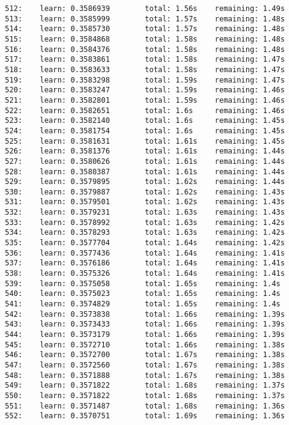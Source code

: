 \documentclass[11pt]{article}
\begin{document}
\begin{Verbatim}[commandchars=\\\{\}]
512:    learn: 0.3586939        total: 1.56s    remaining: 1.49s
513:    learn: 0.3585999        total: 1.57s    remaining: 1.48s
514:    learn: 0.3585730        total: 1.57s    remaining: 1.48s
515:    learn: 0.3584868        total: 1.58s    remaining: 1.48s
516:    learn: 0.3584376        total: 1.58s    remaining: 1.48s
517:    learn: 0.3583861        total: 1.58s    remaining: 1.47s
518:    learn: 0.3583633        total: 1.58s    remaining: 1.47s
519:    learn: 0.3583298        total: 1.59s    remaining: 1.47s
520:    learn: 0.3583247        total: 1.59s    remaining: 1.46s
521:    learn: 0.3582801        total: 1.59s    remaining: 1.46s
522:    learn: 0.3582651        total: 1.6s     remaining: 1.46s
523:    learn: 0.3582140        total: 1.6s     remaining: 1.45s
524:    learn: 0.3581754        total: 1.6s     remaining: 1.45s
525:    learn: 0.3581631        total: 1.61s    remaining: 1.45s
526:    learn: 0.3581376        total: 1.61s    remaining: 1.44s
527:    learn: 0.3580626        total: 1.61s    remaining: 1.44s
528:    learn: 0.3580387        total: 1.61s    remaining: 1.44s
529:    learn: 0.3579895        total: 1.62s    remaining: 1.44s
530:    learn: 0.3579887        total: 1.62s    remaining: 1.43s
531:    learn: 0.3579501        total: 1.62s    remaining: 1.43s
532:    learn: 0.3579231        total: 1.63s    remaining: 1.43s
533:    learn: 0.3578992        total: 1.63s    remaining: 1.42s
534:    learn: 0.3578293        total: 1.63s    remaining: 1.42s
535:    learn: 0.3577704        total: 1.64s    remaining: 1.42s
536:    learn: 0.3577436        total: 1.64s    remaining: 1.41s
537:    learn: 0.3576186        total: 1.64s    remaining: 1.41s
538:    learn: 0.3575326        total: 1.64s    remaining: 1.41s
539:    learn: 0.3575058        total: 1.65s    remaining: 1.4s
540:    learn: 0.3575023        total: 1.65s    remaining: 1.4s
541:    learn: 0.3574829        total: 1.65s    remaining: 1.4s
542:    learn: 0.3573838        total: 1.66s    remaining: 1.39s
543:    learn: 0.3573433        total: 1.66s    remaining: 1.39s
544:    learn: 0.3573179        total: 1.66s    remaining: 1.39s
545:    learn: 0.3572710        total: 1.66s    remaining: 1.38s
546:    learn: 0.3572700        total: 1.67s    remaining: 1.38s
547:    learn: 0.3572560        total: 1.67s    remaining: 1.38s
548:    learn: 0.3571888        total: 1.67s    remaining: 1.38s
549:    learn: 0.3571822        total: 1.68s    remaining: 1.37s
550:    learn: 0.3571822        total: 1.68s    remaining: 1.37s
551:    learn: 0.3571487        total: 1.68s    remaining: 1.36s
552:    learn: 0.3570751        total: 1.69s    remaining: 1.36s

\end{Verbatim}
\end{document}
